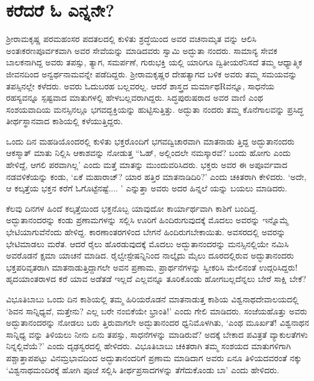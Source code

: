 \section{ಕರೆದರೆ ಓ ಎನ್ನನೇ?}

ಶ‍್ರೀರಾಮಕೃಷ್ಣ ಪರಮಹಂಸರ ಪದತಲದಲ್ಲಿ ಕುಳಿತು ಶ್ರದ್ಧೆಯಿಂದ ಅವರ ವಚನಾಮೃತ ವನ್ನು ಆಲಿಸಿ ಅಂತಃಕರಣಪೂರ್ವಕವಾಗಿ ಅವರ ಸೇವೆಯನ್ನು ಮಾಡಿದವರು ಸ್ವಾಮಿ ಅದ್ಭುತಾ ನಂದರು. ಸಾಮಾನ್ಯ ಸೇವಕ ಬಾಲಕನಾಗಿದ್ದ ಅವರು ತಪಸ್ಸು, ತ್ಯಾಗ, ಸಮರ್ಪಣೆ, ಗುರುಭಕ್ತಿ ಯಲ್ಲಿ ಯಾರಿಗೂ ದ್ವಿತೀಯರೆನಿಸದೆ ತಮ್ಮ ಆಧ್ಯಾತ್ಮಿಕ ಜೀವನದಿಂದ ಅನ್ವರ್ಥನಾಮವನ್ನೇ ಪಡೆದಿದ್ದರು. ಶ‍್ರೀರಾಮಕೃಷ್ಣರ ದೇಹತ್ಯಾಗದ ಬಳಿಕ ಅವರು ತಮ್ಮ ಸಮಯವನ್ನು ತಪಸ್ಸಿನಲ್ಲೇ ಕಳೆದರು. ಅವರು ಓದುಬರಹ ಬಲ್ಲವರಲ್ಲ. ಆದರೆ ಶಾಸ್ತ್ರದ ಮರ್ಮಾಥRವನ್ನೂ, ಸಾಧನೆಯ ರಹಸ್ಯವನ್ನೂ ಸ್ಪಷ್ಟವಾದ ಮಾತುಗಳಲ್ಲಿ ಹೇಳಬಲ್ಲವರಾಗಿದ್ದರು. ಸಿದ್ಧಪುರುಷರಾದ ಅವರ ವಾಣಿ ಎಂಥ ಸಂಶಯವಾದಿಯ ಮನಸ್ಸಿನಲ್ಲೂ ಭಗವದ್ಭಕ್ತಿಯನ್ನು ಹುಟ್ಟಿಸುತ್ತಿತ್ತು. ಅದ್ಭುತಾ ನಂದರು ತಮ್ಮ ಕೊನೆಗಾಲವನ್ನು ಪ್ರಸಿದ್ಧ ತೀರ್ಥಸ್ಥಾನವಾದ ಕಾಶಿಯಲ್ಲಿ ಕಳೆಯುತ್ತಿದ್ದರು.

ಒಂದು ದಿನ ಮಹಡಿಯೊಂದರಲ್ಲಿ ಕುಳಿತು ಭಕ್ತರೊಂದಿಗೆ ಭಗವದ್ವಿಚಾರವಾಗಿ ಮಾತನಾಡು ತ್ತಿದ್ದ ಅದ್ಭುತಾನಂದರು ಆಕಸ್ಮಾತ್ ಮಾತು ನಿಲ್ಲಿಸಿ ಆಕಾಶವನ್ನು ನೋಡುತ್ತ “ಓಹ್, ಅಲ್ಲಿಂದಲೇ ನಮಸ್ಕಾರವೆ? ಬಂದು ಹೋಗು ಎಂದು ಹೇಳಿದ್ದೆ, ಆಗಲಿ ಪರವಾಗಿಲ್ಲ’ ಎಂದು ಮತ್ತೆ ಮಾತನ್ನು ಮುಂದುವರಿಸಿದರು. ಭಕ್ತರು ಅವರ ಈ ಅಪೂರ್ವವಾದ ನಡವಳಿಕೆಯನ್ನು ಕಂಡು, ‘ಏಕೆ ಮಹಾರಾಜ್​? ಯಾರ ಹತ್ತಿರ ಮಾತನಾಡಿದಿರಿ?’ ಎಂದು ಚಕಿತರಾಗಿ ಕೇಳಿದರು. ‘ಅದೇ, ಆ ಕಲ್ಕತ್ತೆಯ ಭಕ್ತನ ಕರೆಗೆ ಓಗೊಟ್ಟೆನಷ್ಟೆ.... ’ ಎನ್ನುತ್ತಾ ಅವರು ಅದರ ಹಿನ್ನಲೆ ಯನ್ನು ಬಯಲು ಮಾಡಿದರು.

ಕೆಲವು ದಿನಗಳ ಹಿಂದೆ ಕಲ್ಕತ್ತೆಯಿಂದ ಭಕ್ತನೊಬ್ಬ ಯಾವುದೋ ಕಾರ್ಯಾರ್ಥವಾಗಿ ಕಾಶಿಗೆ ಬಂದಿದ್ದ. ಅದ್ಭುತಾನಂದರನ್ನು ಕಂಡು ಪ್ರಣಾಮಗಳನ್ನು ಸಲ್ಲಿಸಿ ಊರಿಗೆ ಹಿಂದಿರುಗುವುದಕ್ಕೆ ಮೊದಲು ಅವರನ್ನು ಇನ್ನೊಮ್ಮೆ ಭೇಟಿಯಾಗುವೆನೆಂದು ಹೇಳಿದ್ದ. ಕಾರಣಾಂತರಗಳಿಂದ ಬೇಗನೆ ಹಿಂದಿರುಗಬೇಕಾಯಿತು. ಅವಸರದಲ್ಲಿ ಅವರನ್ನು ಭೇಟಿಮಾಡಲು ಮರೆತ. ಆದರೆ ರೈಲು ಹೊರಡುವುದಕ್ಕೆ ಮೊದಲು ಅದ್ಭುತಾನಂದರನ್ನು ಮನಸ್ಸಿನಲ್ಲಿಯೇ ನಮಿಸಿ ಅವರೊಡನೆ ಕ್ಷಮಾ ಯಾಚನೆ ಮಾಡಿದ. ರೈಲ್ವೇಸ್ಟೇಷನ್ನಿನಿಂದ ನಾಲ್ಕೈದು ಮೈಲು ದೂರದಲ್ಲಿರುವ ಅದ್ಭುತಾನಂದರು ಭಕ್ತಪರಿವೃತರಾಗಿ ಮಾತನಾಡುತ್ತಿದ್ದಾಗಲೇ ಅವನ ಪ್ರಣಾಮ, ಪ್ರಾರ್ಥನೆಗಳನ್ನು ಸ್ವೀಕರಿಸಿ ಮೇಲಿನಂತೆ ಉದ್ಗರಿಸಿದ್ದರು! ಹೃದಯಾಂತರಾಳದ ಕರೆ ಯಾವ ಅಡೆತಡೆ ಇಲ್ಲದೆ ಎಲ್ಲವನ್ನೂ ತೂರಿಕೊಂಡು ಹೋಗಬಲ್ಲದೆನ್ನಲು ಬೇರೆ ಸಾಕ್ಷಿ ಬೇಕೆ?

ವಿಭೂತಿಬಾಬು ಒಂದು ದಿನ ಕಾಶಿಯಲ್ಲಿ ತಮ್ಮ ಹಿರಿಯರೊಡನೆ ಮಾತನಾಡುತ್ತ ಕಾಶಿಯ ವಿಶ್ವನಾಥದೇವಾಲಯದಲ್ಲಿ ‘ಶಿವನ ಸಾನ್ನಿಧ್ಯವೆ, ಮತ್ತೇನು? ಎಲ್ಲ ಬರೇ ನಂಬಿಕೆಯೇ ಭ್ರಾಂತಿ!’ ಎಂದು ಗೇಲಿ ಮಾಡಿದರು. ಸಂಜೆಯಹೊತ್ತು ಅವರು ಅದ್ಭುತಾನಂದರನ್ನು ನೋಡಲು ಬರು ತ್ತಿರುವಾಗಲೇ ಅದ್ಭುತಾನಂದರ ಧ್ವನಿಮೊಳಗಿತು, ‘ಎಂಥ ಮೂರ್ಖತೆ! ವಿಶ್ವನಾಥನ ಸಾನ್ನಿಧ್ಯ ವನ್ನು ತಿಳಿಯಲು ನೀನು ಏನು ತಪಸ್ಸು, ಸಾಧನೆಗಳನ್ನು ಮಾಡಿರುವೆ? ಅದಕ್ಕೆ ಬೇಕಾದ ಪವಿತ್ರತೆ ವ್ಯಾಕುಲತೆಗಳು ನಿನ್ನಲ್ಲಿವೆಯೆ?’ ಎಂದು ದೃಢಸ್ವರದಲ್ಲಿ ಹೇಳಿದರು. ವಿಭೂತಿಬಾಬು ಚಕಿತರಾಗಿ ತಮ್ಮ ಸಂಶಯದ ಮಾತುಗಳಿಗಾಗಿ ಪಶ್ಚಾತ್ತಾಪಪಟ್ಟು ವಿನಮ್ರಭಾವದಿಂದ ಅದ್ಭುತಾನಂದರಿಗೆ ಪ್ರಣಾಮ ಮಾಡಿದಾಗ ಅವರು ಏನೂ ತಿಳಿಯದವರಂತೆ ನಕ್ಕು ‘ವಿಶ್ವನಾಥಮಂದಿರಕ್ಕೆ ಹೋಗಿ ಪೂಜೆ ಸಲ್ಲಿಸಿ ತೀರ್ಥಪ್ರಸಾದಗಳನ್ನು ತೆಗೆದುಕೊಂಡು ಬಾ’ ಎಂದು ಹೇಳಿದರು.

